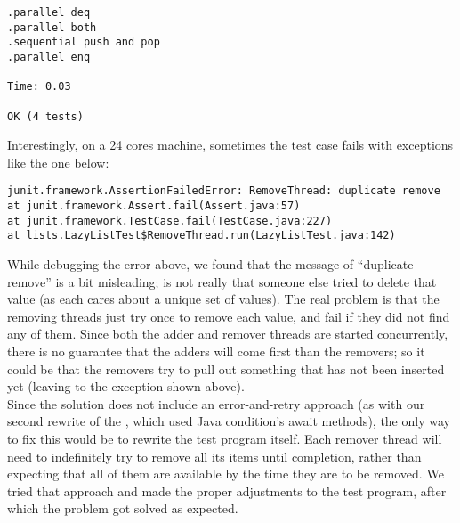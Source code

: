 \begin{verbatim}
.parallel deq
.parallel both
.sequential push and pop
.parallel enq

Time: 0.03

OK (4 tests)
\end{verbatim}
\hfill

Interestingly, on a 24 cores machine, sometimes the test case
 fails with exceptions like the one below: \\

\begin{verbatim}
junit.framework.AssertionFailedError: RemoveThread: duplicate remove
at junit.framework.Assert.fail(Assert.java:57)
at junit.framework.TestCase.fail(TestCase.java:227)
at lists.LazyListTest$RemoveThread.run(LazyListTest.java:142)
\end{verbatim}
\hfill

While debugging the error above, we found that the message of
``duplicate remove'' is a bit misleading; is not really that someone
else tried to delete that value (as each  cares about
a unique set of values). The real problem is that the removing threads
just try once to remove each value, and fail if they did not find any
of them. Since both the adder and remover threads are started
concurrently, there is no guarantee that the adders will come first
than the removers; so it could be that the removers try to pull out
something that has not been inserted yet (leaving to the exception
shown above). \\

Since the  solution does not include an error-and-retry
approach (as with our second rewrite of the , which
used Java condition's await methods), the only way to fix this would
be to rewrite the test program itself. Each remover thread will need
to indefinitely try to remove all its items until completion, rather
than expecting that all of them are available by the time they are to
be removed. We tried that approach and made the proper adjustments
to the test program, after which the problem got solved as expected.
